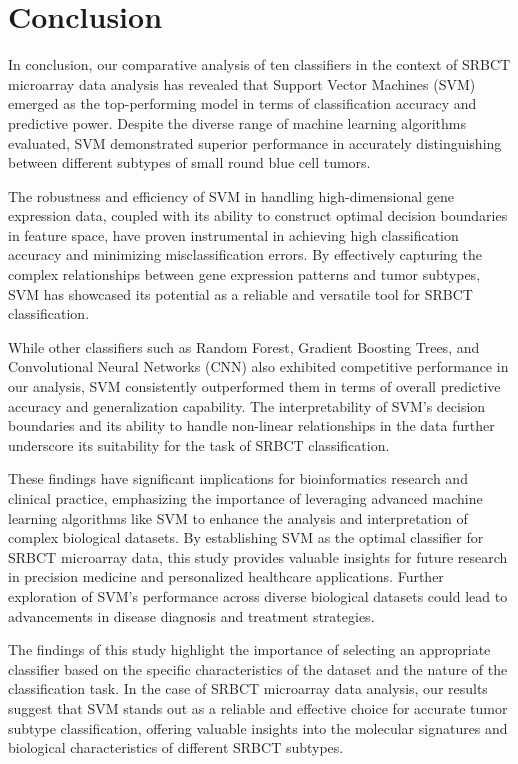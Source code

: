 \documentclass{article}
\begin{document}
\section{Conclusion}

In conclusion, our comparative analysis of ten classifiers in the context of SRBCT microarray data analysis has revealed that Support Vector Machines (SVM) emerged as the top-performing model in terms of classification accuracy and predictive power. Despite the diverse range of machine learning algorithms evaluated, SVM demonstrated superior performance in accurately distinguishing between different subtypes of small round blue cell tumors.

The robustness and efficiency of SVM in handling high-dimensional gene expression data, coupled with its ability to construct optimal decision boundaries in feature space, have proven instrumental in achieving high classification accuracy and minimizing misclassification errors. By effectively capturing the complex relationships between gene expression patterns and tumor subtypes, SVM has showcased its potential as a reliable and versatile tool for SRBCT classification.

While other classifiers such as Random Forest, Gradient Boosting Trees, and Convolutional Neural Networks (CNN) also exhibited competitive performance in our analysis, SVM consistently outperformed them in terms of overall predictive accuracy and generalization capability. The interpretability of SVM's decision boundaries and its ability to handle non-linear relationships in the data further underscore its suitability for the task of SRBCT classification.

These findings have significant implications for bioinformatics research and clinical practice, emphasizing the importance of leveraging advanced machine learning algorithms like SVM to enhance the analysis and interpretation of complex biological datasets. By establishing SVM as the optimal classifier for SRBCT microarray data, this study provides valuable insights for future research in precision medicine and personalized healthcare applications. Further exploration of SVM's performance across diverse biological datasets could lead to advancements in disease diagnosis and treatment strategies.

The findings of this study highlight the importance of selecting an appropriate classifier based on the specific characteristics of the dataset and the nature of the classification task. In the case of SRBCT microarray data analysis, our results suggest that SVM stands out as a reliable and effective choice for accurate tumor subtype classification, offering valuable insights into the molecular signatures and biological characteristics of different SRBCT subtypes.
\end{document}
